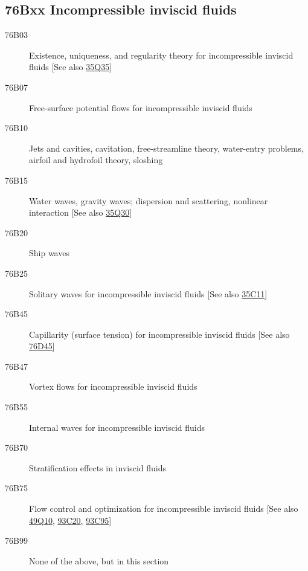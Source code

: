 \subsection*{76Bxx  Incompressible inviscid fluids }\label{76Bxx}
\begin{description}  
\item [76B03]\label{76B03} Existence, uniqueness, and regularity theory for incompressible inviscid fluids [See also \hyperref[35Q35]{35Q35}]
\item [76B07]\label{76B07} Free-surface potential flows for incompressible inviscid fluids
\item [76B10]\label{76B10} Jets and cavities, cavitation, free-streamline theory, water-entry problems, airfoil and hydrofoil theory, sloshing 
\item [76B15]\label{76B15} Water waves, gravity waves; dispersion and scattering, nonlinear interaction [See also \hyperref[35Q30]{35Q30}]
\item [76B20]\label{76B20} Ship waves
\item [76B25]\label{76B25} Solitary waves for incompressible inviscid fluids [See also \hyperref[35C11]{35C11}]
\item [76B45]\label{76B45} Capillarity (surface tension) for incompressible inviscid fluids [See also \hyperref[76D45]{76D45}]
\item [76B47]\label{76B47} Vortex flows for incompressible inviscid fluids
\item [76B55]\label{76B55} Internal waves for incompressible inviscid fluids
\item [76B70]\label{76B70} Stratification effects in inviscid fluids
\item [76B75]\label{76B75} Flow control and optimization for incompressible inviscid fluids [See also \hyperref[49Q10]{49Q10}, \hyperref[93C20]{93C20}, \hyperref[93C95]{93C95}]
\item [76B99]\label{76B99} None of the above, but in this section
\end{description}
